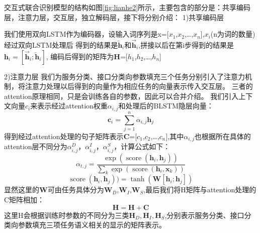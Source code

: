 交互式联合识别模型的结构如图\ref{fig:lianhe2}所示，主要包含的部分是：共享编码层，注意力层，交互层，独立解码层，接下将分别介绍：
1)共享编码层

我们使用双向LSTM作为编码器，设输入词序列是x=[$x_{1}$,$x_{2}$,\dots,$x_{n}$],$x_{i}$(n为词的数量)经过双向LSTM处理后
得到的结果是$\overleftarrow{\mathbf{h}}_{i}$和$\overrightarrow{\mathbf{h}}_{i}$,拼接以后在第i步得到的结果是$\mathbf{h}_{i}=[\overrightarrow{\mathbf{h}}_{i} ;\overleftarrow{\mathbf{h}}_{i}]$,
编码后得到的矩阵为$\mathbf{H}$=[$h_{1}$,$h_{2}$,\dots,$h_{n}$]

2)注意力层
我们为服务分类、接口分类向参数填充三个任务分别引入了注意力机制，将注意力处理以后得到的向量作为相应任务的向量表示传入交互层。
三者的attention原理相同，只是会训练各自的参数，因此可以合并介绍。
我们引入上下文向量${c}_{i}$来表示经过attention权重$α_{i,j}$和处理后的BLSTM隐层向量：
\begin{equation}
    \mathbf{c}_{i}=\sum_{j=1}^{n} \alpha_{i, j} \mathbf{h}_{j}
  \end{equation}
  得到经过attention处理的句子矩阵表示$\mathbf{C}$=[$c_{1}$,$c_{2}$,\dots,$c_{n}$],其中$\alpha_{i, j}$也根据所在具体的attention层不同分为$\alpha_{i, j}^{D}$，$\alpha_{i, j}^{I}$，$\alpha_{i, j}^{S}$，计算公式如下：
  \begin{equation}
    \alpha_{t, j}=\frac{\exp \left(\operatorname{score}\left(\mathbf{h}_{i}, \mathbf{h}_{j}\right)\right)}{\sum_{k} \exp \left(\operatorname{score}\left(\mathbf{h}_{i}, \mathbf{x}_{k}\right)\right)}
    \end{equation}
    \begin{equation}
      \operatorname{score}(\mathbf{h}_{i}, \mathbf{h}_{j}))=\tanh \left(\mathbf{W}\left[\mathbf{h}_{i} ; \mathbf{h}_{j}\right]\right)
    \end{equation}
显然这里的$\mathbf{W}$可由任务具体分为$\mathbf{W}_D$,$\mathbf{W}_I$,$\mathbf{W}_S$,最后我们将H矩阵与attention处理的C矩阵相加：
\begin{equation}
  \mathbf{H}=\mathbf{H}+\mathbf{C}
\end{equation}
这里H会根据训练时参数的不同分为三类$\mathbf{H}_{D},\mathbf{H}_{I},\mathbf{H}_{S}$,分别表示服务分类、接口分类向参数填充三项任务语义相关的显示的矩阵表示。

